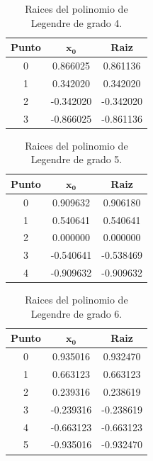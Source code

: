 \begin{table}[H]
    \centering
    \begin{tabular}{ccc} \hline
        \textbf{Punto} & $\mathbf{x_0}$ & \textbf{Raiz} \\ \hline
        0              & 0.866025       & 0.861136      \\
        1              & 0.342020       & 0.342020      \\
        2              & -0.342020      & -0.342020     \\
        3              & -0.866025      & -0.861136     \\ \hline
    \end{tabular}
    \caption{Raices del polinomio de Legendre de grado 4.}
    \label{table:problema2_4}
\end{table}

\begin{table}[H]
    \centering
    \begin{tabular}{ccc} \hline
        \textbf{Punto} & $\mathbf{x_0}$ & \textbf{Raiz} \\ \hline
        0              & 0.909632       & 0.906180      \\
        1              & 0.540641       & 0.540641      \\
        2              & 0.000000       & 0.000000      \\
        3              & -0.540641      & -0.538469     \\
        4              & -0.909632      & -0.909632     \\  \hline
    \end{tabular}
    \caption{Raices del polinomio de Legendre de grado 5.}
    \label{table:problema2_5}
\end{table}

\begin{table}[H]
    \centering
    \begin{tabular}{ccc}\hline
        \textbf{Punto} & $\mathbf{x_0}$ & \textbf{Raiz} \\ \hline
        0              & 0.935016       & 0.932470      \\
        1              & 0.663123       & 0.663123      \\
        2              & 0.239316       & 0.238619      \\
        3              & -0.239316      & -0.238619     \\
        4              & -0.663123      & -0.663123     \\
        5              & -0.935016      & -0.932470     \\ \hline
    \end{tabular}
    \caption{Raices del polinomio de Legendre de grado 6.}
    \label{table:problema2_6}
\end{table}

